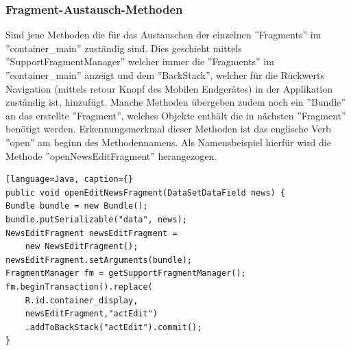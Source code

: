 \subsubsection{Fragment-Austausch-Methoden}
 Sind jene Methoden die für das Austauschen der einzelnen ''Fragments'' im ''container\_main'' zuständig sind. Dies geschieht mittels ''SupportFragmentManager'' welcher immer die ''Fragments'' im ''container\_main'' anzeigt und dem ''BackStack'', welcher für die Rückwerts Navigation (mittels retour Knopf des Mobilen Endgerätes) in der Applikation zuständig ist,  hinzufügt. Manche Methoden übergeben zudem noch ein ''Bundle'' an das erstellte ''Fragment'', welches Objekte enthält die in nächsten ''Fragment'' benötigt werden. Erkennungsmerkmal dieser Methoden ist das englische Verb ''open'' am beginn des Methodennamens. Als Namensbeispiel hierfür wird die Methode ''openNewsEditFragment'' herangezogen.
\begin{lstlisting}[language=Java, caption={}
public void openEditNewsFragment(DataSetDataField news) {
Bundle bundle = new Bundle();
bundle.putSerializable("data", news);
NewsEditFragment newsEditFragment =
    new NewsEditFragment();
newsEditFragment.setArguments(bundle);
FragmentManager fm = getSupportFragmentManager();
fm.beginTransaction().replace(
    R.id.container_display, 	
    newsEditFragment,"actEdit")
    .addToBackStack("actEdit").commit();
}
\end{lstlisting}
